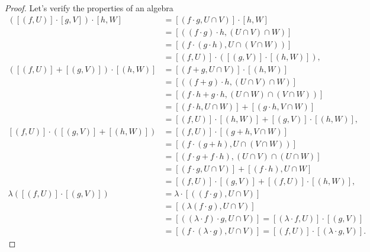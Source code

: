 \begin{proof}
	Let's verify the properties of an algebra
	\begingroup
	\allowdisplaybreaks%
	\begin{align*}
		\left([(f, U)] \cdot [g, V]\right) \cdot [h, W] & = [(f \cdot g, U \cap V)]\cdot [h, W]                                         \\
		                                                & = [((f \cdot g)\cdot h, (U \cap V) \cap W)]                                   \\
		                                                & = [(f \cdot (g \cdot h), U \cap (V \cap W))]                                  \\
		                                                & = [(f, U)]\cdot \left([(g, V)]\cdot [(h, W)]\right),                          \\
		([(f, U)] + [(g, V)])\cdot [(h, W)]             & = [(f + g, U\cap V)]\cdot [(h, W)]                                            \\
		                                                & = [((f + g)\cdot h, (U\cap V) \cap W)]                                        \\
		                                                & = [(f\cdot h + g\cdot h, (U\cap W) \cap (V\cap W))]                           \\
		                                                & = [(f\cdot h, U\cap W)] + [(g\cdot h, V\cap W)]                               \\
		                                                & = [(f, U)]\cdot [(h, W)] + [(g, V)]\cdot [(h, W)],                            \\
		[(f, U)]\cdot ([(g, V)] + [(h, W)])             & = [(f, U)]\cdot [(g + h, V\cap W)]                                            \\
		                                                & = [(f\cdot (g + h), U\cap (V\cap W))]                                         \\
		                                                & = [(f\cdot g + f\cdot h), (U\cap V) \cap (U\cap W)]                           \\
		                                                & = [(f\cdot g, U\cap V)] + [(f\cdot h), U\cap W]                               \\
		                                                & = [(f, U)]\cdot [(g, V)] + [(f, U)]\cdot [(h, W)],                            \\
		\lambda([(f, U)]\cdot [(g, V)])                 & = \lambda\cdot[((f\cdot g), U\cap V)]                                         \\
		                                                & = [(\lambda(f\cdot g), U\cap V)]                                              \\
		                                                & = [((\lambda\cdot f)\cdot g, U\cap V)] = [(\lambda\cdot f, U)]\cdot [(g, V)]  \\
		                                                & = [(f\cdot (\lambda\cdot g), U\cap V)] = [(f, U)]\cdot [(\lambda\cdot g, V)].
	\end{align*}
	\endgroup


\end{proof}
